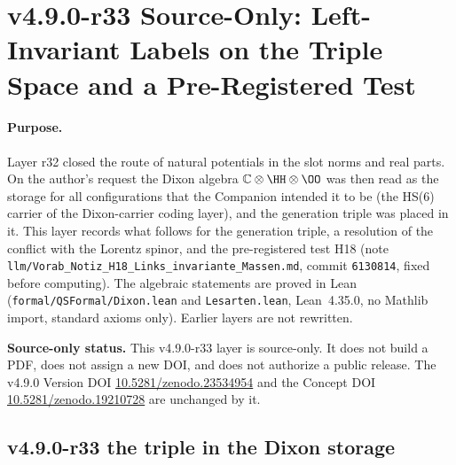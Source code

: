 \clearpage
\section*{v4.9.0-r33 Source-Only: Left-Invariant Labels on the Triple Space and a Pre-Registered Test}
\label{sec:v490-r33-left-invariant-labels}

\paragraph{Purpose.}
Layer r32 closed the route of natural potentials in the slot norms and real parts.  On the author's request the Dixon
algebra \(\mathbb C\otimes\HH\otimes\OO\) was then read as the storage for all configurations that the Companion intended
it to be (the HS(6) carrier of the Dixon-carrier coding layer), and the generation triple was placed in it.  This layer
records what follows for the generation triple, a resolution of the conflict with the Lorentz spinor, and the
pre-registered test H18 (note \texttt{llm/Vorab\_Notiz\_H18\_Links\_invariante\_Massen.md}, commit \texttt{6130814}, fixed
before computing).  The algebraic statements are proved in Lean (\texttt{formal/QSFormal/Dixon.lean} and
\texttt{Lesarten.lean}, Lean~4.35.0, no Mathlib import, standard axioms only).  Earlier layers are not rewritten.

\noindent\textbf{Source-only status.}
This v4.9.0-r33 layer is source-only.  It does not build a PDF, does not assign a new DOI,
and does not authorize a public release.  The v4.9.0 Version DOI
\href{https://doi.org/10.5281/zenodo.23534954}{10.5281/zenodo.23534954} and the Concept DOI
\href{https://doi.org/10.5281/zenodo.19210728}{10.5281/zenodo.19210728} are unchanged by it.

\subsection*{v4.9.0-r33 the triple in the Dixon storage}
\label{subsec:v490-r33-storage}

